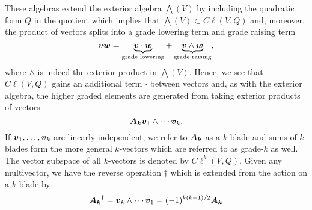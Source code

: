 \documentclass[conf]{new-aiaa}
\begin{document}
These algebras extend the exterior algebra $\bigwedge(V)$ by including the quadratic form $Q$ in the quotient which implies that $\bigwedge(V)\subset C\ell(V,Q)$ and, moreover, the product of vectors splits into a grade lowering term and grade raising term
\begin{equation}
    \boldsymbol{v}\boldsymbol{w}= \underbrace{\boldsymbol{v}\cdot \boldsymbol{w}}_{\textrm{grade lowering}} +\underbrace{\boldsymbol{v}\wedge \boldsymbol{w}}_{\textrm{grade raising}},
\end{equation}
where $\wedge$ is indeed the exterior product in $\bigwedge(V)$. Hence, we see that $C\ell(V,Q)$ gains an additional term $\cdot$ between vectors and, as with the exterior algebra, the higher graded elements are generated from taking exterior products of vectors
\begin{equation}
    \boldsymbol{A_k}\boldsymbol{v}_1 \wedge \cdots \boldsymbol{v}_k,
\end{equation}
If $\boldsymbol{v}_1,\dots,\boldsymbol{v}_k$ are linearly independent, we refer to $\boldsymbol{A_k}$ as a $k$-blade and sums of $k$-blades form the more general $k$-vectors which are referred to as grade-$k$ as well. The vector subspace of all $k$-vectors is denoted by $C\ell^k(V,Q)$. Given any multivector, we have the reverse operation $\dagger$ which is extended from the action on a $k$-blade by
\begin{equation}
    \boldsymbol{A_k}^\dagger = \boldsymbol{v}_k\wedge \cdots \boldsymbol{v}_1 = (-1)^{k(k-1)/2} \boldsymbol{A_k}
\end{equation}
\end{document}
